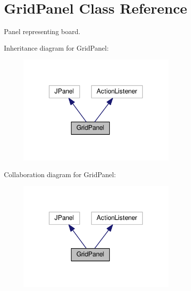 \hypertarget{classGridPanel}{}\section{Grid\+Panel Class Reference}
\label{classGridPanel}


Panel representing board.  




Inheritance diagram for Grid\+Panel\+:\nopagebreak
\begin{figure}[H]
\begin{center}
\leavevmode
\includegraphics[width=224pt]{classGridPanel__inherit__graph}
\end{center}
\end{figure}


Collaboration diagram for Grid\+Panel\+:\nopagebreak
\begin{figure}[H]
\begin{center}
\leavevmode
\includegraphics[width=224pt]{classGridPanel__coll__graph}
\end{center}
\end{figure}
